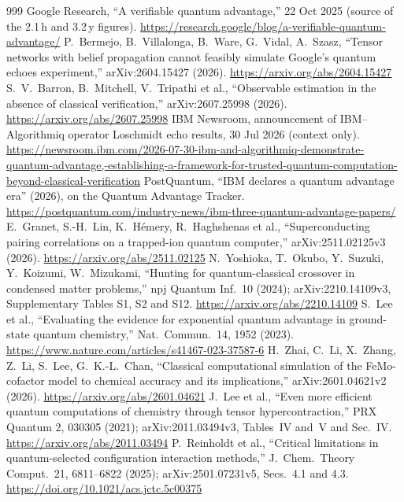 \begin{thebibliography}{999}
 Google Research, ``A verifiable quantum advantage,'' 22 Oct 2025 (source of the 2.1\,h and 3.2\,y figures). \url{https://research.google/blog/a-verifiable-quantum-advantage/}
 P.~Bermejo, B.~Villalonga, B.~Ware, G.~Vidal, A.~Szasz, ``Tensor networks with belief propagation cannot feasibly simulate Google's quantum echoes experiment,'' arXiv:2604.15427 (2026). \url{https://arxiv.org/abs/2604.15427}
 S.~V.~Barron, B.~Mitchell, V.~Tripathi et al., ``Observable estimation in the absence of classical verification,'' arXiv:2607.25998 (2026). \url{https://arxiv.org/abs/2607.25998}
 IBM Newsroom, announcement of IBM--Algorithmiq operator Loschmidt echo results, 30 Jul 2026 (context only). \url{https://newsroom.ibm.com/2026-07-30-ibm-and-algorithmiq-demonstrate-quantum-advantage,-establishing-a-framework-for-trusted-quantum-computation-beyond-classical-verification}
 PostQuantum, ``IBM declares a quantum advantage era'' (2026), on the Quantum Advantage Tracker. \url{https://postquantum.com/industry-news/ibm-three-quantum-advantage-papers/}
 E.~Granet, S.-H.~Lin, K.~H\'emery, R.~Haghshenas et al., ``Superconducting pairing correlations on a trapped-ion quantum computer,'' arXiv:2511.02125v3 (2026). \url{https://arxiv.org/abs/2511.02125}
 N.~Yoshioka, T.~Okubo, Y.~Suzuki, Y.~Koizumi, W.~Mizukami, ``Hunting for quantum-classical crossover in condensed matter problems,'' npj Quantum Inf.\ 10 (2024); arXiv:2210.14109v3, Supplementary Tables S1, S2 and S12. \url{https://arxiv.org/abs/2210.14109}
 S.~Lee et al., ``Evaluating the evidence for exponential quantum advantage in ground-state quantum chemistry,'' Nat.\ Commun.\ 14, 1952 (2023). \url{https://www.nature.com/articles/s41467-023-37587-6}
 H.~Zhai, C.~Li, X.~Zhang, Z.~Li, S.~Lee, G.~K.-L.~Chan, ``Classical computational simulation of the FeMo-cofactor model to chemical accuracy and its implications,'' arXiv:2601.04621v2 (2026). \url{https://arxiv.org/abs/2601.04621}
 J.~Lee et al., ``Even more efficient quantum computations of chemistry through tensor hypercontraction,'' PRX Quantum 2, 030305 (2021); arXiv:2011.03494v3, Tables~IV and~V and Sec.~IV. \url{https://arxiv.org/abs/2011.03494}
 P.~Reinholdt et al., ``Critical limitations in quantum-selected configuration interaction methods,'' J.\ Chem.\ Theory Comput.\ 21, 6811--6822 (2025); arXiv:2501.07231v5, Secs.~4.1 and 4.3. \url{https://doi.org/10.1021/acs.jctc.5c00375}

\end{thebibliography}

